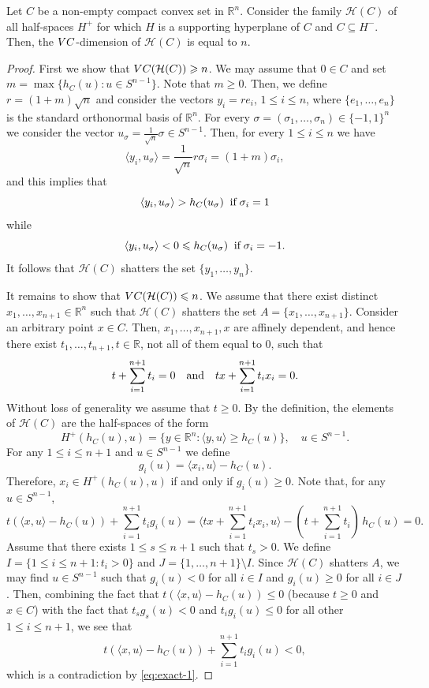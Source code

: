 \documentclass[10pt,a4paper]{amsart}
\newcommand{\gr}{\geqslant}
\newcommand{\ls}{\leqslant}
\begin{document}
\begin{lemma}\label{lem:exact-vc}Let $C$ be a non-empty compact convex set in $\mathbb{R}^n$.
Consider the family $\mathcal{H}(C)$ of all half-spaces $H^+$ for which $H$ is a supporting hyperplane
of $C$ and $C\subseteq H^-$. Then, the ${\rm VC}$-dimension of $\mathcal{H}(C)$ is equal to $n$.
\end{lemma}

\begin{proof}First we show that ${\rm VC}(\mathcal{H}(C))\gr n$. We may assume that $0\in C$ and set
$m=\max\{h_C(u):u\in S^{n-1}\}$. Note that $m\gr 0$. Then, we define $r=(1+m)\sqrt{n}$ and consider
the vectors $y_i=re_i$, $1\ls i\ls n$, where $\{e_1,\ldots ,e_n\}$ is the standard orthonormal
basis of $\mathbb{R}^n$. For every $\sigma=(\sigma_1,\ldots ,\sigma_n)\in\{-1,1\}^n$ we consider the vector
$u_{\sigma}=\frac{1}{\sqrt{n}}\sigma\in S^{n-1}$. Then, for every $1\ls i\ls n$ we have
$$\langle y_i,u_{\sigma}\rangle =\frac{1}{\sqrt{n}}r\sigma_i=(1+m)\sigma_i,$$
and this implies that
$$\langle y_i,u_{\sigma}\rangle >h_C(u_{\sigma})\;\;\hbox{if}\;\sigma_i=1$$
while
$$\langle y_i,u_{\sigma}\rangle <0\ls h_C(u_{\sigma})\;\;\hbox{if}\;\sigma_i=-1.$$
It follows that $\mathcal{H}(C)$ shatters the set $\{y_1,\ldots ,y_n\}$.

It remains to show that ${\rm VC}(\mathcal{H}(C))\ls n$. We assume that there exist distinct
$x_1,\ldots ,x_{n+1}\in\mathbb{R}^n$ such that $\mathcal{H}(C)$ shatters the set $A=\{x_1,\ldots ,x_{n+1}\}$.
Consider an arbitrary point $x\in C$. Then, $x_1,\ldots ,x_{n+1},x$ are affinely dependent, and hence there
exist $t_1,\ldots ,t_{n+1},t\in\mathbb{R}$, not all of them equal to $0$, such that
$$t+\sum_{i=1}^{n+1}t_i=0\quad\hbox{and}\quad tx+\sum_{i=1}^{n+1}t_ix_i=0.$$
Without loss of generality we assume that $t\gr 0$. By the definition, the elements of $\mathcal{H}(C)$
are the half-spaces of the form
$$H^+(h_C(u),u)=\{y\in\mathbb{R}^n:\langle y,u\rangle \gr h_C(u)\},\quad u\in S^{n-1}.$$
For any $1\ls i\ls n+1$ and $u\in S^{n-1}$ we define
$$g_i(u)=\langle x_i,u\rangle -h_C(u).$$
Therefore, $x_i\in H^+(h_C(u),u)$ if and only if $g_i(u)\gr 0$. Note that, for any $u\in S^{n-1}$,
\begin{equation}\label{eq:exact-1}t(\langle x,u\rangle -h_C(u))+\sum_{i=1}^{n+1}t_ig_i(u)
=\Big\langle tx+\sum_{i=1}^{n+1}t_ix_i,u\Big\rangle -\left(t+\sum_{i=1}^{n+1}t_i\right)\,h_C(u)=0.\end{equation}
Assume that there exists $1\ls s\ls n+1$ such that $t_s>0$. We define $I=\{1\ls i\ls n+1:t_i>0\}$
and $J=\{1,\ldots ,n+1\}\setminus I$. Since $\mathcal{H}(C)$ shatters $A$, we
may find $u\in S^{n-1}$ such that $g_i(u)<0$ for all $i\in I$ and $g_i(u)\gr 0$ for all $i\in J$.
Then, combining the fact that $t(\langle x,u\rangle -h_C(u))\ls 0$ (because $t\gr 0$ and $x\in C$) with the fact
that $t_sg_s(u)<0$ and $t_ig_i(u)\ls 0$ for all other $1\ls i\ls n+1$, we see that
$$t(\langle x,u\rangle -h_C(u))+\sum_{i=1}^{n+1}t_ig_i(u)<0,$$
which is a contradiction by \eqref{eq:exact-1}.


\end{proof}
\end{document}
